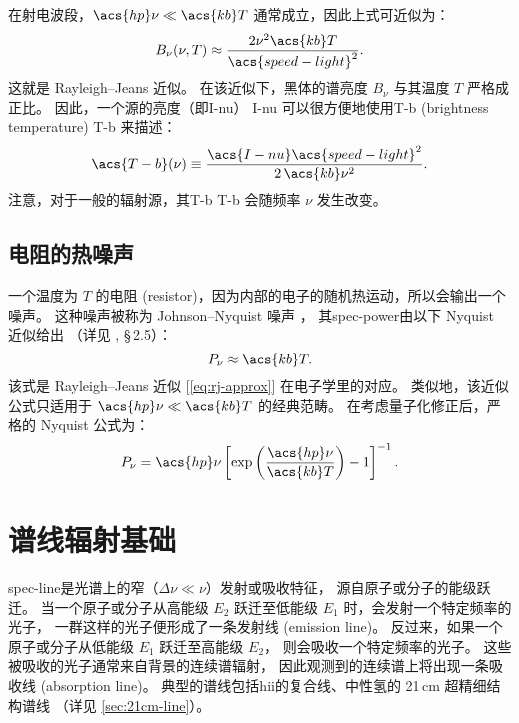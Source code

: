 在射电波段，$\acs{hp}\nu \ll \acs{kb}T$ 通常成立，因此上式可近似为：
\begin{equation}
  \label{eq:rj-approx}
  B_{\nu}(\nu, T)
    \approx \frac{2 \nu^2 \acs{kb} T}{\acs{speed-light}^2} .
\end{equation}
这就是 Rayleigh--Jeans 近似。
在该近似下，黑体的谱亮度 $B_{\nu}$ 与其温度 $T$ 严格成正比。
因此，一个源的亮度（即\acl{I-nu}） \ac{I-nu}
可以很方便地使用\acl{T-b} (brightness temperature) \ac{T-b} 来描述：
\begin{equation}
  \label{eq:Tb}
  \acs{T-b}(\nu)
    \equiv \frac{\acs{I-nu} \acs{speed-light}^2}{2 \,\acs{kb} \nu^2} .
\end{equation}
注意，对于一般的辐射源，其\acl{T-b} \ac{T-b} 会随频率 $\nu$ 发生改变。

\subsection{电阻的热噪声}

一个温度为 $T$ 的电阻 (resistor)，因为内部的电子的随机热运动，所以会输出一个噪声。
这种噪声被称为 Johnson--Nyquist 噪声 \cite{johnson1928,nyquist1928}，
其\ac{spec-power}由以下 Nyquist 近似给出
（详见 , \S\,2.5）：
\begin{equation}
  \label{eq:nyquist-approx}
  P_{\nu} \approx \acs{kb} T .
\end{equation}
该式是 Rayleigh--Jeans 近似 [\autoref{eq:rj-approx}] 在电子学里的对应。
类似地，该近似公式只适用于 $\acs{hp}\nu \ll \acs{kb}T$ 的经典范畴。
在考虑量子化修正后，严格的 Nyquist 公式为：
\begin{equation}
  \label{eq:nyquist}
  P_{\nu} = \acs{hp} \nu
    \left[ \exp\left( \frac{\acs{hp} \nu}{\acs{kb} T} \right) - 1 \right]^{-1} .
\end{equation}


\section{谱线辐射基础}
\label{sec:spectral-line}

\acf{spec-line}是光谱上的窄（$\Delta\nu \ll \nu$）发射或吸收特征，
源自原子或分子的能级跃迁。
当一个原子或分子从高能级 $E_2$ 跃迁至低能级 $E_1$ 时，会发射一个特定频率的光子，
一群这样的光子便形成了一条发射线 (emission line)。
反过来，如果一个原子或分子从低能级 $E_1$ 跃迁至高能级 $E_2$，
则会吸收一个特定频率的光子。
这些被吸收的光子通常来自背景的连续谱辐射，
因此观测到的连续谱上将出现一条吸收线 (absorption line)。
典型的谱线包括\ac{hii}的复合线、中性氢的 21\,cm 超精细结构谱线
（详见 \autoref{sec:21cm-line}）。

